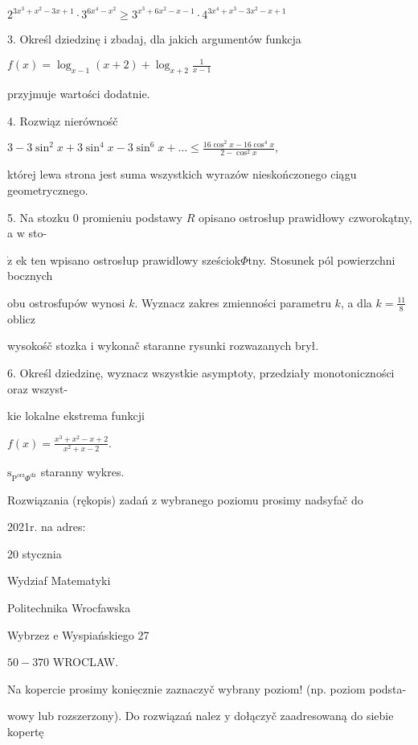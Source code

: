 \documentclass[a4paper,12pt]{article}
\begin{document}
$2^{3x^{3}+x^{2}-3x+1}\cdot 3^{6x^{4}-x^{2}}\geq 3^{x^{3}+6x^{2}-x-1}\cdot 4^{3x^{4}+x^{3}-3x^{2}-x+1}$

3. Określ dziedzinę $\mathrm{i}$ zbadaj, dla jakich argumentów funkcja

$f(x)=\displaystyle \log_{x-1}(x+2)+\log_{x+2}\frac{1}{x-1}$

przyjmuje wartości dodatnie.

4. Rozwiąz nierównośč

$3-3\displaystyle \sin^{2}x+3\sin^{4}x-3\sin^{6}x+\ldots\leq\frac{16\cos^{2}x-16\cos^{4}x}{2-\cos^{2}x},$

której lewa strona jest suma wszystkich wyrazów nieskończonego ciągu geometrycznego.

5. Na stozku $0$ promieniu podstawy $R$ opisano ostrosłup prawidłowy czworokątny, a $\mathrm{w}$ sto-

$\dot{\mathrm{z}}$ ek ten wpisano ostrosłup prawidlowy sześciok$\Phi$tny. Stosunek pól powierzchni bocznych

obu ostrosfupów wynosi $k$. Wyznacz zakres zmienności parametru $k$, a dla $k=\displaystyle \frac{11}{8}$ oblicz

wysokośč stozka $\mathrm{i}$ wykonač staranne rysunki rozwazanych brył.

6. Określ dziedzinę, wyznacz wszystkie asymptoty, przedziały monotoniczności oraz wszyst-

kie lokalne ekstrema funkcji

$f(x)=\displaystyle \frac{x^{3}+x^{2}-x+2}{x^{2}+x-2}.$

$\mathrm{s}_{\mathrm{P}^{\mathrm{o}\mathrm{r}\mathrm{z}}\Phi^{\mathrm{d}\acute{\mathrm{z}}}}$ staranny wykres.

Rozwiązania (rękopis) zadań z wybranego poziomu prosimy nadsyfač do

2021r. na adres:

20 stycznia

Wydziaf Matematyki

Politechnika Wrocfawska

Wybrzez $\mathrm{e}$ Wyspiańskiego 27

$50-370$ WROCLAW.

Na kopercie prosimy $\underline{\mathrm{k}\mathrm{o}\mathrm{n}\mathrm{i}\mathrm{e}\mathrm{c}\mathrm{z}\mathrm{n}\mathrm{i}\mathrm{e}}$ zaznaczyč wybrany poziom! (np. poziom podsta-

wowy lub rozszerzony). Do rozwiązań nalez $\mathrm{y}$ dołączyč zaadresowaną do siebie kopertę
\end{document}

